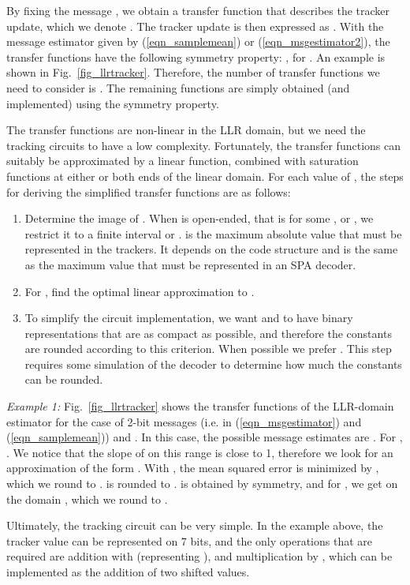 \documentclass[12pt,journal,twoside,draftcls,onecolumn]{IEEEtran}
\begin{document}
	By fixing the message , we obtain a transfer function that describes the tracker update, which we denote . The tracker update is then expressed as
.
With the message estimator given by (\ref{eqn_samplemean}) or (\ref{eqn_msgestimator2}), the transfer functions have the following symmetry property: , for . An example is shown in Fig.~\ref{fig_llrtracker}.
	Therefore, the number of transfer functions we need to consider is . The remaining functions are simply obtained (and implemented) using the symmetry property.
	
	The transfer functions are non-linear in the LLR domain, but we need the tracking circuits to have a low complexity. Fortunately, the transfer functions can suitably be approximated by a linear function, combined with saturation functions at either or both ends of the linear domain. For each value of , the steps for deriving the simplified transfer functions are as follows:
	\begin{enumerate}
	\item Determine the image  of . When  is open-ended, that is for some ,  or , we restrict it to a finite interval  or .  is the maximum absolute value that must be represented in the trackers. It depends on the code structure and is the same as the maximum value that must be represented in an SPA decoder.
	\item For , find the optimal linear approximation  to .
	\item To simplify the circuit implementation, we want  and  to have binary representations that are as compact as possible, and therefore the constants are rounded according to this criterion. When possible we prefer . This step requires some simulation of the decoder to determine how much the constants can be rounded.
	\end{enumerate}
	
	\emph{Example 1:}
	Fig.~\ref{fig_llrtracker} shows the transfer functions of the LLR-domain estimator for the case of 2-bit messages (i.e.  in (\ref{eqn_msgestimator}) and (\ref{eqn_samplemean})) and . In this case, the possible message estimates are .
	For , . We notice that the slope of  on this range is close to 1, therefore we look for an approximation of the form . 
	With , the mean squared error is minimized by , which we round to .  is rounded to .
	 is obtained by symmetry, and for , we get  on the domain , which we round to .
	
	Ultimately, the tracking circuit can be very simple. In the example above, the tracker value can be represented on 7 bits, and the only operations that are required are addition with  (representing ), and multiplication by , which can be implemented as the addition of two shifted values.
	
\end{document}

